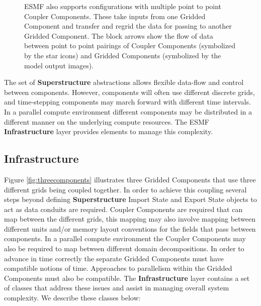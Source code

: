 \begin{figure}
\caption{ESMF also supports configurations with multiple point to point Coupler Components. 
These take inputs from one Gridded
Component and transfer and regrid the data for passing to another Gridded Component. The block arrows show the
flow of data between point to point pairings of Coupler Components (symbolized by the star icons) and Gridded 
Components (symbolized by the model output images).}
\label{fig:point2point}
\end{figure}

The set of {\bf Superstructure} abstractions allows flexible data-flow and control between components. However, 
components will often use different discrete grids, and time-stepping components may march forward with different time
intervals. In a parallel compute environment different components may be distributed in a different manner on the
underlying compute resources. The ESMF {\bf Infrastructure} layer provides elements to manage this complexity.

\subsection{Infrastructure}
\label{sec:infrastructure}
Figure \ref{fig:threecomponents} illustrates three Gridded Components that use three different grids being coupled together. In 
order to achieve this coupling several steps beyond defining {\bf Superstructure} Import State and Export State objects to act
as data conduits are required. Coupler Components are required that can map between the different
grids, this mapping may also involve mapping between different units and/or memory layout conventions for the fields that
pass between components. In a parallel compute environment the Coupler Components may also be required to map between different 
domain decompositions. In order to advance in time correctly the separate Gridded Components must have compatible notions
of time. Approaches to parallelism within the Gridded Components must also be compatible. The {\bf Infrastructure} layer
contains a set of classes that address these issues and assist in managing overall system complexity. We describe
these classes below:

